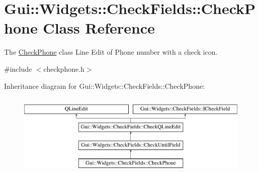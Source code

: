 \hypertarget{classGui_1_1Widgets_1_1CheckFields_1_1CheckPhone}{}\section{Gui\+:\+:Widgets\+:\+:Check\+Fields\+:\+:Check\+Phone Class Reference}
\label{classGui_1_1Widgets_1_1CheckFields_1_1CheckPhone}


The \hyperlink{classGui_1_1Widgets_1_1CheckFields_1_1CheckPhone}{Check\+Phone} class Line Edit of Phone number with a check icon.  




{\ttfamily \#include $<$checkphone.\+h$>$}

Inheritance diagram for Gui\+:\+:Widgets\+:\+:Check\+Fields\+:\+:Check\+Phone\+:\begin{figure}[H]
\begin{center}
\leavevmode
\includegraphics[height=4.000000cm]{da/dc0/classGui_1_1Widgets_1_1CheckFields_1_1CheckPhone}
\end{center}
\end{figure}
